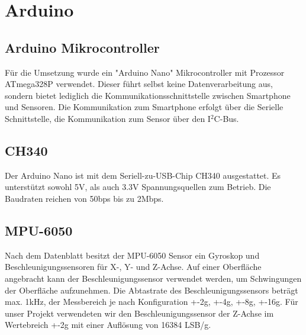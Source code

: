 \section{Arduino}
\label{sec:Arduino}

\subsection*{Arduino Mikrocontroller}
Für die Umsetzung wurde ein "Arduino Nano" Mikrocontroller mit Prozessor ATmega328P verwendet. Dieser führt selbst keine Datenverarbeitung aus, sondern bietet lediglich die Kommunikationsschnittstelle zwischen Smartphone und Sensoren. Die Kommunikation zum Smartphone erfolgt über die Serielle Schnittstelle, die Kommunikation zum Sensor über den I$^2$C-Bus. 


\subsection*{CH340}
Der Arduino Nano ist mit dem  Seriell-zu-USB-Chip CH340 ausgestattet.
Es unterstützt sowohl 5V, als auch 3.3V Spannungsquellen zum Betrieb.
Die Baudraten reichen von 50bps bis zu 2Mbps.


\subsection*{MPU-6050}
Nach dem Datenblatt \cite{MPU6050} besitzt der MPU-6050 Sensor ein Gyroskop und Beschleunigungssensoren für X-, Y- und Z-Achse.
Auf einer Oberfläche angebracht kann der Beschleunigungssensor verwendet werden, um Schwingungen der Oberfläche aufzunehmen.
Die Abtastrate des Beschleunigungssensors beträgt max. 1kHz, der Messbereich je nach Konfiguration +-2g, +-4g, +-8g, +-16g.
Für unser Projekt verwendeten wir den Beschleunigungssensor der Z-Achse im Wertebreich +-2g mit einer Auflösung von 16384 LSB/g.
